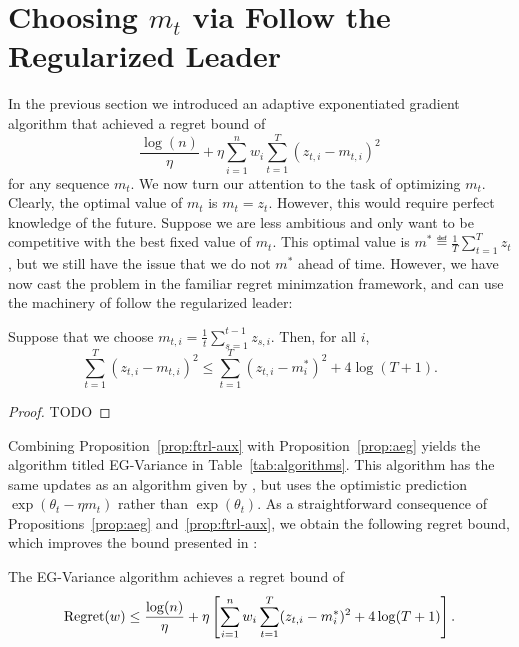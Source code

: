 \documentclass[paper_icml.tex]{subfiles}
\begin{document}
\section{Choosing $m_t$ via Follow the Regularized Leader} 
\label{sec:ftrl-aux}
In the previous section we introduced an adaptive exponentiated 
gradient algorithm that achieved a regret bound of 
\[ \frac{\log(n)}{\eta} + \eta \sum_{i=1}^n w_i \sum_{t=1}^T (z_{t,i} - m_{t,i})^2 \]
for any sequence $m_t$. We now turn our attention to the task of 
optimizing $m_t$. Clearly, the optimal value of $m_t$ is $m_t = z_t$. However, 
this would require perfect knowledge of the future. Suppose we are less ambitious 
and only want to be competitive with the best fixed value of $m_t$. This optimal value 
is $m^* \eqdef \frac{1}{T} \sum_{t=1}^T z_t$, but we still have the issue that 
we do not $m^*$ ahead of time. However, we have now cast the problem in the familiar 
regret minimzation framework, and can use the machinery of follow the regularized 
leader:
\begin{proposition}
\label{prop:ftrl-aux}
Suppose that we choose $m_{t,i} = \frac{1}{t} \sum_{s=1}^{t-1} z_{s,i}$. 
Then, for all $i$, 
\[ \sum_{t=1}^T (z_{t,i} - m_{t,i})^2 \leq \sum_{t=1}^T (z_{t,i} - m^*_i)^2 + 4\log(T+1). \]
\end{proposition}
\begin{proof}
TODO
\end{proof}
Combining Proposition~\ref{prop:ftrl-aux} with Proposition~\ref{prop:aeg} yields 
the algorithm titled EG-Variance in Table~\ref{tab:algorithms}. This algorithm has the 
same updates as an algorithm given by \cite{hazan2010variation}, but uses the 
optimistic prediction $\exp(\theta_t - \eta m_t)$ rather than $\exp(\theta_t)$. 
As a straightforward consequence of Propositions~\ref{prop:aeg} and~\ref{prop:ftrl-aux}, we 
obtain the following regret bound, which improves the bound presented in 
\cite{hazan2010variation}:
\begin{corollary}
The EG-Variance algorithm achieves a regret bound of
\[ \operatorname{Regret}(w) \leq \frac{\log(n)}{\eta} + \eta \left[ \sum_{i=1}^n w_i \sum_{t=1}^T (z_{t,i} - m_i^*)^2 + 4\log(T+1) \right]. \]
\end{corollary}
\end{document}
